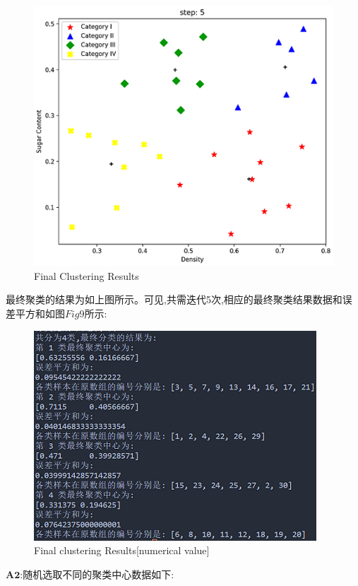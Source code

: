 \documentclass[homework]{IEEEtran}
\begin{document}
\begin{CJK}{UTF8}{gkai}
\begin{figure}[htb]
    \centerline{\includegraphics{Images/fig7.png}}
    \caption{Final Clustering Results}
    \label{fig7}
    \end{figure} \par
最终聚类的结果为如上图所示。可见,共需迭代5次,相应的最终聚类结果数据和误差平方和如图$Fig9$所示: \par
\begin{figure}[htb]
    \centerline{\includegraphics{Images/fig8.png}}
    \caption{Final clustering Results[numerical value]}
    \label{fig8}
    \end{figure} \par
$\mathbf{A2}$:随机选取不同的聚类中心数据如下:     \par

\end{CJK}
\end{document}

